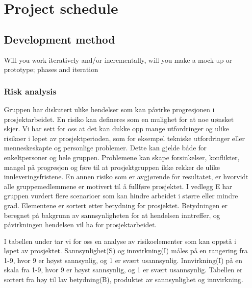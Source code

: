 \chapter{Project schedule}






\section{Development method}
Will you work iteratively and/or incrementally, will you make a 
mock-up or prototype; phases and iteration



\subsection{Risk analysis}
Gruppen har diskutert ulike hendelser som kan påvirke progresjonen i prosjektarbeidet. En risiko
kan defineres som en mulighet for at noe uønsket skjer. Vi har sett for oss at det kan dukke
opp mange utfordringer og ulike risikoer i løpet av prosjektperioden, som for eksempel tekniske
utfordringer eller menneskeskapte og personlige problemer. Dette kan gjelde både for enkeltpersoner
og hele gruppen. Problemene kan skape forsinkelser, konflikter, mangel på progresjon og føre til at
prosjektgruppen ikke rekker de ulike innleveringsfristene. En annen risiko som er avgjørende for
resultatet, er hvorvidt alle gruppemedlemmene er motivert til å fullføre prosjektet.
I vedlegg E har gruppen vurdert flere scenarioer som kan hindre arbeidet i større eller mindre
grad. Elementene er sortert etter betydning for prosjektet. Betydningen er beregnet på bakgrunn av
sannsynligheten for at hendelsen inntreffer, og påvirkningen hendelsen vil ha for prosjektarbeidet.

I tabellen under tar vi for oss en analyse av risikoelementer som kan oppstå i løpet av prosjektet.
Sannsynlighet(S) og innvirkning(I) måles på en rangering fra 1-9, hvor 9 er høyst sannsynlig,
og 1 er svært usannsynlig. Innvirkning(I) på en skala fra 1-9, hvor 9 er høyst sannsynlig, og 1 er
svært usannsynlig. Tabellen er sortert fra høy til lav betydning(B), produktet av sannsynlighet og
innvirkning.


